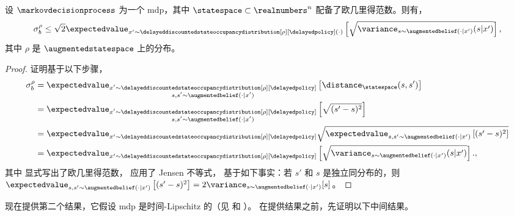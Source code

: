 \begin{lemma}[欧几里得界]
\label{lem:bound_sigma_eucl}
    设 $\markovdecisionprocess$ 为一个 \gls{mdp}，其中 $\statespace\subset\realnumbers^n$ 配备了欧几里得范数。则有，
    \begin{align*}
        \sigma_b^\rho \leq \sqrt{2}\expectedvalue_{x'\sim \delayeddiscountedstateoccupancydistribution[\rho][\delayedpolicy](\cdot)}\left[\sqrt{ \variance_{s\sim \augmentedbelief(\cdot|x')}(s|x')}\right],
    \end{align*}
    其中 $\rho$ 是 $\augmentedstatespace$ 上的分布。
\end{lemma}
\begin{proof}
    证明基于以下步骤，
    \begin{align}
        \sigma_b^\rho
        &= \expectedvalue_{\substack{x'\sim \delayeddiscountedstateoccupancydistribution[\rho][\delayedpolicy]\\ s,s'\sim \augmentedbelief(\cdot\vert x')}}\left[ \distance_{\statespace}(s,s') \right]\nonumber
        \\
        &= \expectedvalue_{\substack{x'\sim \delayeddiscountedstateoccupancydistribution[\rho][\delayedpolicy]\\ s,s'\sim \augmentedbelief(\cdot\vert x')}}\left[ \sqrt{(s'-s)^2} \right]\label{eq:def_euclid}
        \\
        &= \expectedvalue_{x'\sim \delayeddiscountedstateoccupancydistribution[\rho][\delayedpolicy]}\sqrt{\expectedvalue_{s,s'\sim \augmentedbelief(\cdot\vert x')} \left[ (s'-s)^2 \right]}\label{eq:jensen_var}
        \\
        &= \expectedvalue_{x'\sim \delayeddiscountedstateoccupancydistribution[\rho][\delayedpolicy]}\left[\sqrt{ \variance_{s\sim \augmentedbelief(\cdot|x')}(s|x')}\right].\label{eq:idd_var_s},
    \end{align}
    其中  显式写出了欧几里得范数， 应用了 Jensen 不等式，
     基于如下事实：若 $s'$ 和 $s$ 是独立同分布的，则 $\textstyle\expectedvalue_{s,s'\sim \augmentedbelief(\cdot\vert x')} \left[ (s'-s)^2 \right] = 2\variance_{s\sim \augmentedbelief(\cdot|x')}[s]$。
\end{proof}


现在提供第二个结果，它假设 \gls{mdp} 是时间-Lipschitz 的（见  和 ）。
在提供结果之前，先证明以下中间结果。

